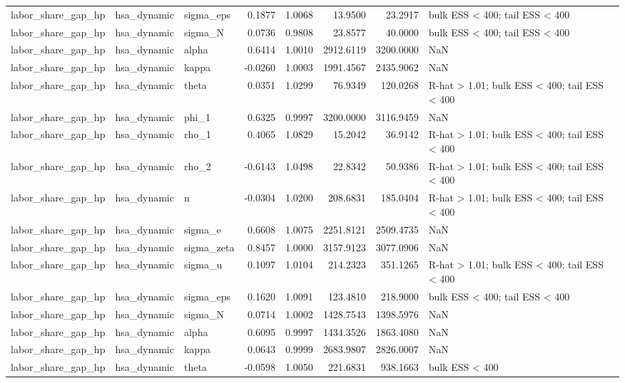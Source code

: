 \begin{tabular}{lllrrrrl}
labor\_share\_gap\_hp & hsa\_dynamic & sigma\_eps & 0.1877 & 1.0068 & 13.9500 & 23.2917 & bulk ESS < 400; tail ESS < 400 \\
labor\_share\_gap\_hp & hsa\_dynamic & sigma\_N & 0.0736 & 0.9808 & 23.8577 & 40.0000 & bulk ESS < 400; tail ESS < 400 \\
labor\_share\_gap\_hp & hsa\_dynamic & alpha & 0.6414 & 1.0010 & 2912.6119 & 3200.0000 & NaN \\
labor\_share\_gap\_hp & hsa\_dynamic & kappa & -0.0260 & 1.0003 & 1991.4567 & 2435.9062 & NaN \\
labor\_share\_gap\_hp & hsa\_dynamic & theta & 0.0351 & 1.0299 & 76.9349 & 120.0268 & R-hat > 1.01; bulk ESS < 400; tail ESS < 400 \\
labor\_share\_gap\_hp & hsa\_dynamic & phi\_1 & 0.6325 & 0.9997 & 3200.0000 & 3116.9459 & NaN \\
labor\_share\_gap\_hp & hsa\_dynamic & rho\_1 & 0.4065 & 1.0829 & 15.2042 & 36.9142 & R-hat > 1.01; bulk ESS < 400; tail ESS < 400 \\
labor\_share\_gap\_hp & hsa\_dynamic & rho\_2 & -0.6143 & 1.0498 & 22.8342 & 50.9386 & R-hat > 1.01; bulk ESS < 400; tail ESS < 400 \\
labor\_share\_gap\_hp & hsa\_dynamic & n & -0.0304 & 1.0200 & 208.6831 & 185.0404 & R-hat > 1.01; bulk ESS < 400; tail ESS < 400 \\
labor\_share\_gap\_hp & hsa\_dynamic & sigma\_e & 0.6608 & 1.0075 & 2251.8121 & 2509.4735 & NaN \\
labor\_share\_gap\_hp & hsa\_dynamic & sigma\_zeta & 0.8457 & 1.0000 & 3157.9123 & 3077.0906 & NaN \\
labor\_share\_gap\_hp & hsa\_dynamic & sigma\_u & 0.1097 & 1.0104 & 214.2323 & 351.1265 & R-hat > 1.01; bulk ESS < 400; tail ESS < 400 \\
labor\_share\_gap\_hp & hsa\_dynamic & sigma\_eps & 0.1620 & 1.0091 & 123.4810 & 218.9000 & bulk ESS < 400; tail ESS < 400 \\
labor\_share\_gap\_hp & hsa\_dynamic & sigma\_N & 0.0714 & 1.0002 & 1428.7543 & 1398.5976 & NaN \\
labor\_share\_gap\_hp & hsa\_dynamic & alpha & 0.6095 & 0.9997 & 1434.3526 & 1863.4080 & NaN \\
labor\_share\_gap\_hp & hsa\_dynamic & kappa & 0.0643 & 0.9999 & 2683.9807 & 2826.0007 & NaN \\
labor\_share\_gap\_hp & hsa\_dynamic & theta & -0.0598 & 1.0050 & 221.6831 & 938.1663 & bulk ESS < 400 \\

\end{tabular}

